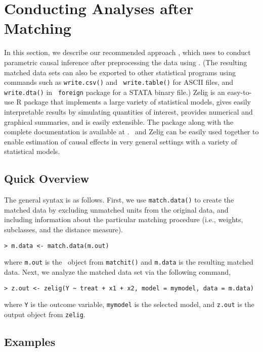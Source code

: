 \section{Conducting Analyses after Matching}
\label{sec:analysis}

In this section, we describe our recommended approach
\citep{HoImaKin05}, which uses
 to conduct parametric
causal inference after preprocessing the data using \MatchIt.  (The
resulting matched data sets can also be exported to other statistical
programs using commands such as {\tt write.csv()} and {\tt
  write.table()} for ASCII files, and {\tt write.dta()} in {\tt
  foreign} package for a STATA binary file.)  Zelig
\citep{ImaKinLau04} is an easy-to-use R package that implements a
large variety of statistical models, gives easily interpretable
results by simulating quantities of interest, provides numerical and
graphical summaries, and is easily extensible.  The package along with
the complete documentation is available at
.
\MatchIt\ and Zelig can be easily used together to enable estimation
of causal effects in very general settings with a variety of
statistical models.

\subsection{Quick Overview}

The general syntax is as follows. First, we use \texttt{match.data()}
to create the matched data by excluding unmatched units from the
original data, and including information about the particular matching
procedure (i.e., weights, subclasses, and the distance measure).
\begin{verbatim}
> m.data <- match.data(m.out)
\end{verbatim}
where {\tt m.out} is the \MatchIt\ object from {\tt matchit()} and
{\tt m.data} is the resulting matched data.  Next, we analyze the
matched data set via the following command,
\begin{verbatim}
> z.out <- zelig(Y ~ treat + x1 + x2, model = mymodel, data = m.data)
\end{verbatim}

where {\tt Y} is the outcome variable, {\tt mymodel} is the selected
model, and {\tt z.out} is the output object from {\tt zelig}.

\subsection{Examples}

